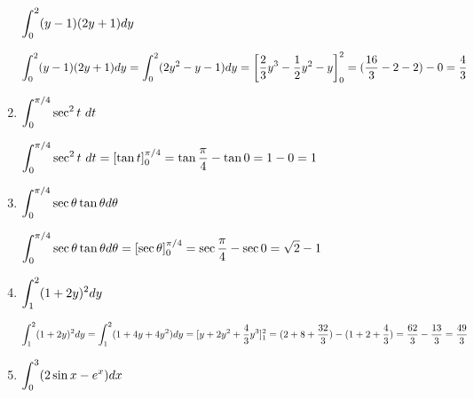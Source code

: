 \begin{enumerate}[1.]
\begin{Question}
  $\displaystyle \int_0^2 (y - 1)(2y + 1) dy$
\end{Question}

\begin{Solution}
    
  $\displaystyle \int_0^2 (y - 1)(2y + 1) dy = \int_0^2 (2y^2 - y - 1) dy =
    \left[ \frac{2}{3} y^3 - \frac{1}{2} y^2 - y \right]_0^2 = 
    ( \frac{16}{3} - 2 - 2) - 0 = \frac{4}{3}$
\end{Solution}

\item \begin{Question}
    
  $\displaystyle \int_0^{\pi / 4} \sec^2 t ~dt$
\end{Question}

\begin{Solution}
    
  $\displaystyle \int_0^{\pi / 4} \sec^2 t ~dt = [\tan t]_0^{\pi / 4} =
    \tan \frac{\pi}{4} - \tan 0 = 1 - 0 = 1$
    
\end{Solution}

\item \begin{Question}
    
  $\displaystyle \int_0^{\pi / 4} \sec \theta \tan \theta d \theta$
\end{Question}

\begin{Solution}
  $\displaystyle \int_0^{\pi / 4} \sec \theta \tan \theta d \theta = 
    [ \sec \theta ]_0^{\pi / 4} = 
    \sec \frac{\pi}{4} - \sec 0 = \sqrt{2} - 1$
\end{Solution}

\item \begin{Question}
    
  $\displaystyle \int_1^2 (1 + 2y)^2 dy$
\end{Question}

\begin{Solution}
  $\displaystyle \int_1^2 (1 + 2y)^2 dy = 
    \int_1^2 (1 + 4y + 4y^2) dy =
    [y + 2y^2 + \frac{4}{3} y^3]_1^2 =
    (2 + 8 + \frac{32}{3}) - (1 + 2 + \frac{4}{3}) = 
    \frac{62}{3} - \frac{13}{3} = \frac{49}{3}$
\end{Solution}

\item \begin{Question}
    
  $\displaystyle \int_0^3 (2 \sin x - e^x) dx$
\end{Question}


\end{enumerate}
